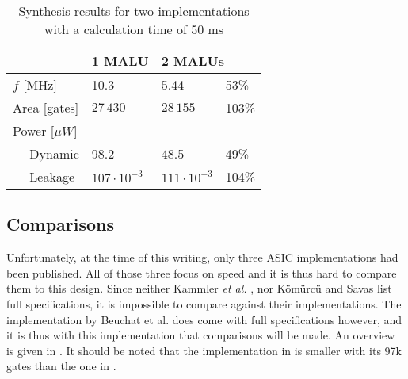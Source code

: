 \begin{table}[h]
	\caption{Synthesis results for two implementations with a calculation time of 50 ms}
	\label{table-mult-malu}

	\centering
	\begin{tabular}{lll@{$\;\;$}l}
		\toprule
		& 1 MALU	& \multicolumn{2}{l}{2 MALUs}\\
		\midrule
		$f$ [MHz]				& 10.3						& 5.44						& 53\% \\ 
		Area [gates]			& $27\,430$					& $28\,155$					& 103\% \\
		Power [$\mu W$]		& 								& 								& \\
		$\quad$ Dynamic		& 98.2						& 48.5						& 49\% \\
		$\quad$ Leakage		& $107 \cdot 10^{-3}$	& $111 \cdot 10^{-3}$	& 104\% \\
		\bottomrule	
	\end{tabular}
\end{table}

\subsection{Comparisons}

Unfortunately, at the time of this writing, only three ASIC implementations had been published. All of those three focus on speed and it is thus hard to compare them to this design. Since neither Kammler \emph{et al.} \cite{kammler}, nor K\"om\"urc\"u and Savas \cite{savas} list full specifications, it is impossible to compare against their implementations. The implementation by Beuchat {et al.} \cite{beuchat-asic} does come with full specifications however, and it is thus with this implementation that comparisons will be made. An overview is given in . It should be noted that the implementation in \cite{kammler} is smaller with its 97k gates than the one in \cite{beuchat-asic}.

